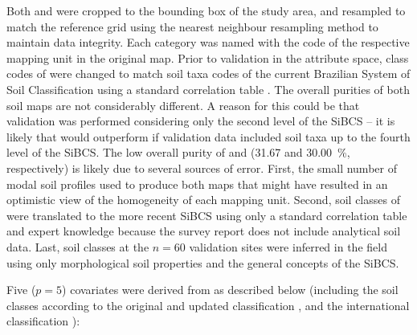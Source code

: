 Both \soilOld{} and \soilNew{} were cropped to the bounding box of the study area, and resampled to match the 
reference grid using the nearest neighbour resampling method to maintain data integrity. Each category was 
named with the code of the respective mapping unit in the original map. Prior to validation in the attribute 
space, class codes of \soilOld{} were changed to match soil taxa codes of the current Brazilian System of Soil 
Classification using a standard correlation table \cite{SantosEtAl2006}. The overall purities of both soil maps 
are not considerably different. A reason for this could be that validation was performed considering only the 
second level of the SiBCS -- it is likely that \soilNew{} would outperform \soilOld{} if validation data 
included soil taxa up to the fourth level of the SiBCS. The low overall purity of \soilOld{} and 
\soilNew{} (\num{31.67} and \SI{30.00}{\percent}, respectively) is likely due to several sources of error. 
First, the small number of modal soil profiles used to produce both maps that might have resulted in an 
optimistic view of the homogeneity of each mapping unit. Second, soil classes of \soilOld{} were translated to 
the more recent SiBCS using only a standard correlation table \cite{SantosEtAl2006} and expert knowledge 
because the survey report does not include analytical soil data. Last, soil classes at the $n = 60$ validation 
sites were inferred in the field using only morphological soil properties and the general concepts of the 
SiBCS.

Five ($p = 5$) covariates were derived from \soilOld{} as described below (including the soil classes according 
to the original and updated classification \cite{AzolinEtAl1988, SantosEtAl2013a}, and the international 
classification \cite{IUSSWorkingGroupWRB2007}):

